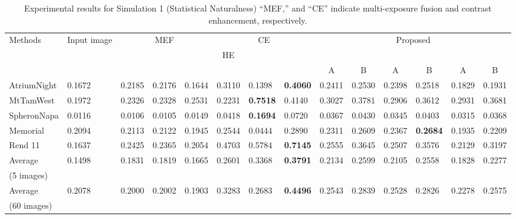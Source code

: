 \documentclass[paper]{ieice}
\begin{document}
%
\begin{table*}[!t]
  \centering
  \caption{Experimental results for Simulation 1 (Statistical Naturalness)
  ``MEF,'' and ``CE'' indicate
  multi-exposure fusion and contrast enhancement, respectively.}
  {\footnotesize
  \begin{tabular}{l|l|lll|lll|ll|ll|ll} \hline \hline
    \multirow{3}{*}{Methods} & \multirow{3}{10mm}{Input image} & \multicolumn{3}{c|}{MEF} &
    \multicolumn{3}{c|}{CE} & \multicolumn{6}{c}{Proposed}\\\cline{3-14}
    & & \multicolumn{1}{c}{\cite{mertens2009exposure}} &
    \multicolumn{1}{c}{\cite{sakai2015hybrid}} & \multicolumn{1}{c|}{\cite{nejati2017fast}} &
    \multicolumn{1}{c}{HE} & \multicolumn{1}{c}{\cite{zuiderveld1994contrast}} &
    \multicolumn{1}{c|}{\cite{wu2017contrast}} &
    \multicolumn{2}{c|}{\cite{mertens2009exposure}} &
    \multicolumn{2}{c|}{\cite{sakai2015hybrid}} &
    \multicolumn{2}{c}{\cite{nejati2017fast}}\\
    &&&&&&&& \multicolumn{1}{c}{A} & \multicolumn{1}{c|}{B} &
    \multicolumn{1}{c}{A} & \multicolumn{1}{c|}{B} & \multicolumn{1}{c}{A} &
    \multicolumn{1}{c}{B}\\
    \hdashline
    AtriumNight & 0.1672 & 0.2185 & 0.2176 & 0.1644 & 0.3110 & 0.1398 & \textbf{0.4060} & 0.2411 & 0.2530 & 0.2398 & 0.2518 & 0.1829 & 0.1931 \\
    MtTamWest & 0.1972 & 0.2326 & 0.2328 & 0.2531 & 0.2231 & \textbf{0.7518} & 0.4140 & 0.3027 & 0.3781 & 0.2906 & 0.3612 & 0.2931 & 0.3681 \\
    SpheronNapa & 0.0116 & 0.0106 & 0.0105 & 0.0149 & 0.0418 & \textbf{0.1694} & 0.0720 & 0.0367 & 0.0430 & 0.0345 & 0.0403 & 0.0315 & 0.0368 \\
    Memorial & 0.2094 & 0.2113 & 0.2122 & 0.1945 & 0.2544 & 0.0444 & 0.2890 & 0.2311 & 0.2609 & 0.2367 & \textbf{0.2684} & 0.1935 & 0.2209 \\
    Rend 11 & 0.1637 & 0.2425 & 0.2365 & 0.2054 & 0.4703 & 0.5784 & \textbf{0.7145} & 0.2555 & 0.3645 & 0.2507 & 0.3576 & 0.2129 & 0.3197 \\\hdashline
    Average & \multirow{2}{*}{0.1498} & \multirow{2}{*}{0.1831} & \multirow{2}{*}{0.1819} & \multirow{2}{*}{0.1665} & \multirow{2}{*}{0.2601} & \multirow{2}{*}{0.3368} & \multirow{2}{*}{\textbf{0.3791}} & \multirow{2}{*}{0.2134} & \multirow{2}{*}{0.2599} & \multirow{2}{*}{0.2105} & \multirow{2}{*}{0.2558} & \multirow{2}{*}{0.1828} & \multirow{2}{*}{0.2277} \\
    (5 images) &  &  &  &  &  &  &  &  &  &  &  &  &  \\\hdashline
    Average & \multirow{2}{*}{0.2078} & \multirow{2}{*}{0.2000} & \multirow{2}{*}{0.2002} & \multirow{2}{*}{0.1903} & \multirow{2}{*}{0.3283} & \multirow{2}{*}{0.2683} & \multirow{2}{*}{\textbf{0.4496}} & \multirow{2}{*}{0.2543} & \multirow{2}{*}{0.2839} & \multirow{2}{*}{0.2528} & \multirow{2}{*}{0.2826} & \multirow{2}{*}{0.2278} & \multirow{2}{*}{0.2575} \\
    (60 images) &  &  &  &  &  &  &  &  &  &  &  &  & \\\hline
  \end{tabular}
  }
  \label{tab:HDRNaturalness}
\end{table*}
\end{document}
